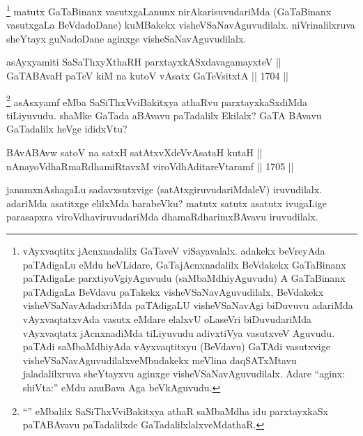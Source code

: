 \begin{artha}
\footnote{vAyxvaqtitx jAcnxnadalilx GaTaveV viSayavalalx. adakekx beVreyAda paTAdigaLu eMdu heVLidare, GaTajAcnxnadalilx BeVdakekx GaTaBinanx paTAdigaLe parxtiyoVgiyAguvudu (saMbaMdhiyAguvudu) A GaTaBinanx paTAdigaLa BeVdavu paTakekx visheVSaNavAguvudilalx, BeVdakekx visheVSaNavAdadxriMda paTAdigaLU visheVSaNavAgi biDuvuvu adariMda vAyxvaqtatxvAda vasutx eMdare elalxvU oLaseVri biDuvudariMda vAyxvaqtatx jAcnxnadiMda tiLiyuvudu adivxtiVya vasutxveV Aguvudu. paTAdi saMbaMdhiyAda vAyxvaqtitxyu (BeVdavu) GaTAdi vasutxvige visheVSaNavAguvudilalxveMbudakekx meVlina daqSATxMtavu jaladalilxruva sheYtayxvu aginxge visheVSaNavAguvudilalx. Adare ``aginx: shiVta:'' eMdu anuBava Aga beVkAguvudu.}
matutx GaTaBinanx vasutxgaLanunx nirAkarisuvudariMda (GaTaBinanx vasutxgaLa BeVdadoDane) kuMBakekx visheVSaNavAguvudilalx. niVrinalilxruva sheYtayx guNadoDane aginxge visheSaNavAguvudilalx.
\end{artha}


\begin{shl}
asAyxyamiti SaSaThxyXthaRH parxtayxkASxdavagamayxteV || \\
GaTABAvaH paTeV kiM na kutoV vA\s satx GaTeV\s sitxtA \hfill || 1704 ||  
\end{shl}

\begin{artha}
\footnote{``\stext'' eMbalilx SaSiThxVviBakitxya athaR saMbaMdha idu parxtayxkaSx paTABAvavu paTadalilxde GaTadalilxlalxveMdathaR.}
asAsxyamf eMba SaSiThxVviBakitxya athaRvu parxtayxkaSxdiMda tiLiyuvudu. shaMke GaTada aBAvavu paTadalilx Ekilalx? GaTA BAvavu GaTadalilx heVge ididxVtu?
\end{artha}


\begin{shl}
BAvABAvw satoV na satxH satAtxvXdeVvAsataH kutaH || \\
nAnayoVdhaRmaRdhamiRtavxM viroVdhAditareVtaramf \hfill || 1705 ||  
\end{shl}

\begin{artha}
janamxnAshagaLu sadavxsutxvige (satAtxgiruvudariMdaleV) iruvudilalx. adariMda asatitxge elilxMda barabeVku? matutx satutx asatutx ivugaLige parasapxra viroVdhaviruvudariMda dhamaRdharimxBAvavu iruvudilalx.
\end{artha}

